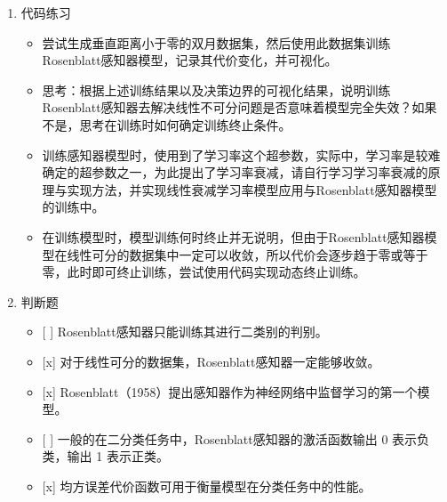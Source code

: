 \documentclass[11pt]{article}
\providecommand{\tightlist}{%
      \setlength{\itemsep}{0pt}\setlength{\parskip}{0pt}}
\begin{document}
\begin{enumerate}
\def\labelenumi{\arabic{enumi}.}
\item
  代码练习

  \begin{itemize}
  \item
    尝试生成垂直距离小于零的双月数据集，然后使用此数据集训练Rosenblatt感知器模型，记录其代价变化，并可视化。
  \item
    思考：根据上述训练结果以及决策边界的可视化结果，说明训练Rosenblatt感知器去解决线性不可分问题是否意味着模型完全失效？如果不是，思考在训练时如何确定训练终止条件。
  \item
    训练感知器模型时，使用到了学习率这个超参数，实际中，学习率是较难确定的超参数之一，为此提出了学习率衰减，请自行学习学习率衰减的原理与实现方法，并实现线性衰减学习率模型应用与Rosenblatt感知器模型的训练中。
  \item
    在训练模型时，模型训练何时终止并无说明，但由于Rosenblatt感知器模型在线性可分的数据集中一定可以收敛，所以代价会逐步趋于零或等于零，此时即可终止训练，尝试使用代码实现动态终止训练。
  \end{itemize}
\item
  判断题

  \begin{itemize}
  \tightlist
  \item
    {[} {]} Rosenblatt感知器只能训练其进行二类别的判别。
  \item
    {[}x{]} 对于线性可分的数据集，Rosenblatt感知器一定能够收敛。
  \item
    {[}x{]}
    Rosenblatt（1958）提出感知器作为神经网络中监督学习的第一个模型。
  \item
    {[} {]} 一般的在二分类任务中，Rosenblatt感知器的激活函数输出 0
    表示负类，输出 1 表示正类。
  \item
    {[}x{]} 均方误差代价函数可用于衡量模型在分类任务中的性能。
  \end{itemize}
\end{enumerate}


    
    
    
    
\end{document}
